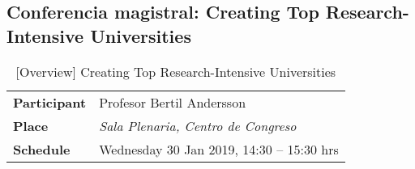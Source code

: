 \documentclass[11pt,a4paper]{article}
\begin{document}











\clearpage

\subsection{Conferencia magistral: Creating Top Research-Intensive Universities}\label{sec:conference2}

\parencite{Andersson2019}
\begin{table}[h] %
\centering
\begin{tabular}{|l|l|}
\hline
\textbf{Participant} & Profesor Bertil Andersson \\
\textbf{Place}       & \emph{Sala Plenaria, Centro de Congreso} \\
\textbf{Schedule}    & Wednesday 30 Jan 2019, 14:30 – 15:30 hrs \\
\hline
\end{tabular}
\caption{[Overview] Creating Top Research-Intensive Universities}\label{tab:table}
\end{table}

\end{document}
